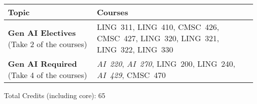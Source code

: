 \begin{longtable}{p{7cm}>{\raggedleft\arraybackslash}p{7cm}}
Topic & Courses \\
\toprule
\textbf{Gen AI Electives} (Take 2 of the courses) & LING~311, LING~410, CMSC~426, CMSC~427, LING~320, LING~321, LING~322, LING~330 \\
\textbf{Gen AI Required} (Take 4 of the courses) & \textit{AI~220}, \textit{AI~270}, LING~200, LING~240, \textit{AI~429}, CMSC~470 \\
\bottomrule
\end{longtable}
Total Credits (including core): 65

